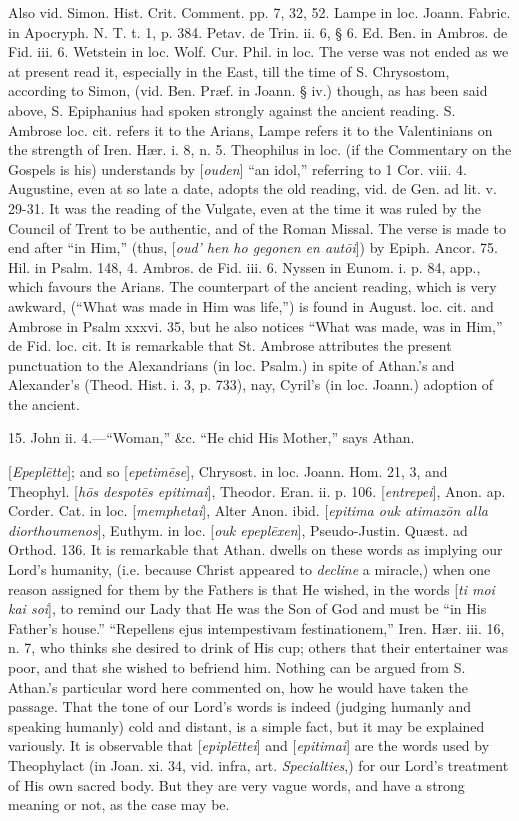 Also vid. Simon. Hist. Crit. Comment. pp. 7, 32,
52. Lampe in loc. Joann. Fabric. in Apocryph. N. T. t. 1, p. 384.
Petav. de Trin. ii. 6, § 6. Ed. Ben. in Ambros. de Fid. iii. 6.
Wetstein in loc. Wolf. Cur. Phil. in loc. The verse was not ended as
we at present read it, especially in the East, till the time of S.
Chrysostom, according to Simon, (vid. Ben. Præf. in Joann. § iv.)
though, as has been said above, S. Epiphanius had spoken strongly
against the ancient reading. S. Ambrose loc. cit. refers it to the
Arians, Lampe refers it to the Valentinians on the strength of Iren. Hær.
i. 8, n. 5. Theophilus in loc. (if the Commentary on the Gospels is
his) understands by [\emph{ouden}] ``an idol,'' referring to 1 Cor.
viii. 4. Augustine, even at so late a date, adopts the old reading,
vid. de Gen. ad lit. v. 29-31. It was the reading of the Vulgate, even
at the time it was ruled by the Council of Trent to be authentic, and
of the Roman Missal. The verse is made to end after ``in Him,'' (thus, [\emph{oud'
hen ho gegonen en aut\={o}i}]) by Epiph. Ancor. 75. Hil.
in Psalm. 148, 4. Ambros. de Fid. iii. 6. Nyssen in Eunom. i. p. 84,
app., which favours the Arians. The counterpart of the ancient
reading, which is very awkward, (``What was made in Him was life,'') is
found in August. loc. cit. and Ambrose in Psalm xxxvi. 35, but he also
notices ``What was made, was in Him,'' de Fid. loc. cit. It is
remarkable that St. Ambrose attributes the present punctuation
to the Alexandrians (in loc. Psalm.) in spite of Athan.'s and
Alexander's (Theod. Hist. i. 3, p. 733), nay, Cyril's (in loc. Joann.)
adoption of the ancient.

15. John ii. 4.—``Woman,'' \&c. ``He chid His
Mother,'' says Athan.

[\emph{Epepl\={e}tte}]; and so [\emph{epetim\={e}se}],
Chrysost. in loc. Joann. Hom. 21, 3, and Theophyl. [\emph{h\={o}s
despot\={e}s epitimai}], Theodor. Eran. ii. p. 106. [\emph{entrepei}],
Anon. ap. Corder. Cat. in loc. [\emph{memphetai}], Alter Anon. ibid. [\emph{epitima
ouk atimaz\={o}n alla diorthoumenos}], Euthym. in loc. [\emph{ouk
epepl\={e}xen}], Pseudo-Justin. Quæst. ad Orthod. 136. It is
remarkable that Athan. dwells on these words as implying our Lord's
humanity, (i.e. because Christ appeared to \emph{decline} a miracle,)
when one reason assigned for them by the Fathers is that He wished, in
the words [\emph{ti moi kai soi}], to remind our Lady that He was the
Son of God and must be ``in His Father's house.'' ``Repellens ejus
intempestivam festinationem,'' Iren. Hær. iii. 16, n. 7, who thinks
she desired to drink of His cup; others that their entertainer was
poor, and that she wished to befriend him. Nothing can be argued from
S. Athan.'s particular word here commented on, how he would have taken
the passage. That the tone of our Lord's words is indeed (judging
humanly and speaking humanly) cold and distant, is a simple fact, but
it may be explained variously. It is observable that [\emph{epipl\={e}ttei}]
and [\emph{epitimai}] are the words used by Theophylact (in Joan. xi.
34, vid. infra, art. \emph{Specialties},) for our Lord's treatment of
His own sacred body. But they are very vague words, and have a
strong meaning or not, as the case may be.

